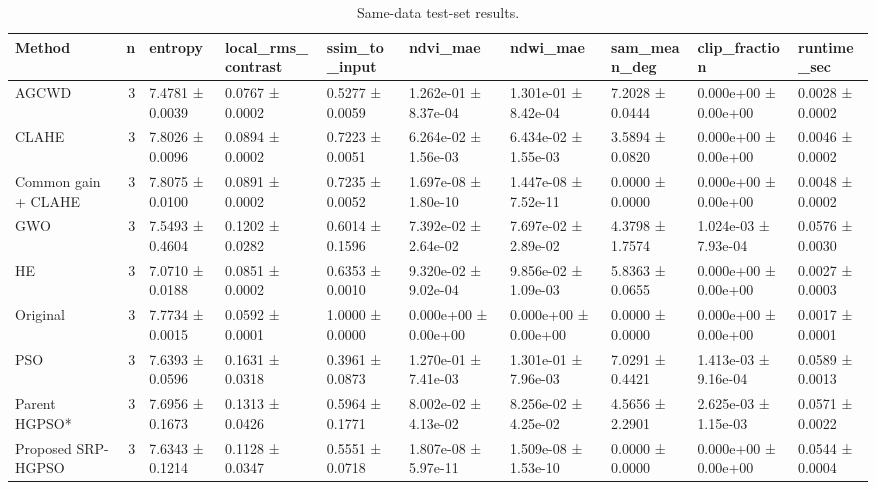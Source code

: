 \begin{table}
\caption{Same-data test-set results.}
\label{tab:main_results}
\begin{tabular}{lrllllllll}
\toprule
Method & n & entropy & local\_rms\_contrast & ssim\_to\_input & ndvi\_mae & ndwi\_mae & sam\_mean\_deg & clip\_fraction & runtime\_sec \\
\midrule
AGCWD & 3 & 7.4781 ± 0.0039 & 0.0767 ± 0.0002 & 0.5277 ± 0.0059 & 1.262e-01 ± 8.37e-04 & 1.301e-01 ± 8.42e-04 & 7.2028 ± 0.0444 & 0.000e+00 ± 0.00e+00 & 0.0028 ± 0.0002 \\
CLAHE & 3 & 7.8026 ± 0.0096 & 0.0894 ± 0.0002 & 0.7223 ± 0.0051 & 6.264e-02 ± 1.56e-03 & 6.434e-02 ± 1.55e-03 & 3.5894 ± 0.0820 & 0.000e+00 ± 0.00e+00 & 0.0046 ± 0.0002 \\
Common gain + CLAHE & 3 & 7.8075 ± 0.0100 & 0.0891 ± 0.0002 & 0.7235 ± 0.0052 & 1.697e-08 ± 1.80e-10 & 1.447e-08 ± 7.52e-11 & 0.0000 ± 0.0000 & 0.000e+00 ± 0.00e+00 & 0.0048 ± 0.0002 \\
GWO & 3 & 7.5493 ± 0.4604 & 0.1202 ± 0.0282 & 0.6014 ± 0.1596 & 7.392e-02 ± 2.64e-02 & 7.697e-02 ± 2.89e-02 & 4.3798 ± 1.7574 & 1.024e-03 ± 7.93e-04 & 0.0576 ± 0.0030 \\
HE & 3 & 7.0710 ± 0.0188 & 0.0851 ± 0.0002 & 0.6353 ± 0.0010 & 9.320e-02 ± 9.02e-04 & 9.856e-02 ± 1.09e-03 & 5.8363 ± 0.0655 & 0.000e+00 ± 0.00e+00 & 0.0027 ± 0.0003 \\
Original & 3 & 7.7734 ± 0.0015 & 0.0592 ± 0.0001 & 1.0000 ± 0.0000 & 0.000e+00 ± 0.00e+00 & 0.000e+00 ± 0.00e+00 & 0.0000 ± 0.0000 & 0.000e+00 ± 0.00e+00 & 0.0017 ± 0.0001 \\
PSO & 3 & 7.6393 ± 0.0596 & 0.1631 ± 0.0318 & 0.3961 ± 0.0873 & 1.270e-01 ± 7.41e-03 & 1.301e-01 ± 7.96e-03 & 7.0291 ± 0.4421 & 1.413e-03 ± 9.16e-04 & 0.0589 ± 0.0013 \\
Parent HGPSO* & 3 & 7.6956 ± 0.1673 & 0.1313 ± 0.0426 & 0.5964 ± 0.1771 & 8.002e-02 ± 4.13e-02 & 8.256e-02 ± 4.25e-02 & 4.5656 ± 2.2901 & 2.625e-03 ± 1.15e-03 & 0.0571 ± 0.0022 \\
Proposed SRP-HGPSO & 3 & 7.6343 ± 0.1214 & 0.1128 ± 0.0347 & 0.5551 ± 0.0718 & 1.807e-08 ± 5.97e-11 & 1.509e-08 ± 1.53e-10 & 0.0000 ± 0.0000 & 0.000e+00 ± 0.00e+00 & 0.0544 ± 0.0004 \\
\bottomrule
\end{tabular}
\end{table}
